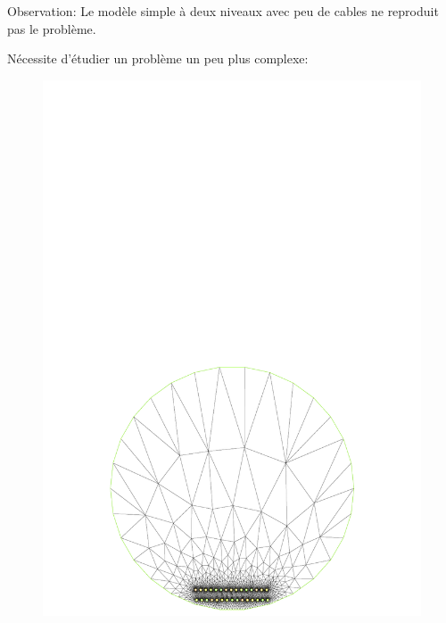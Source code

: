 \begin{frame}
Observation: Le modèle simple à deux niveaux avec peu de cables ne reproduit pas le problème. 

Nécessite d'étudier un problème un peu plus complexe:
  \begin{figure}
    \includegraphics[scale=0.15]{figures/bigcircle}  \hspace{1pt}

\end{figure}
\end{frame}

